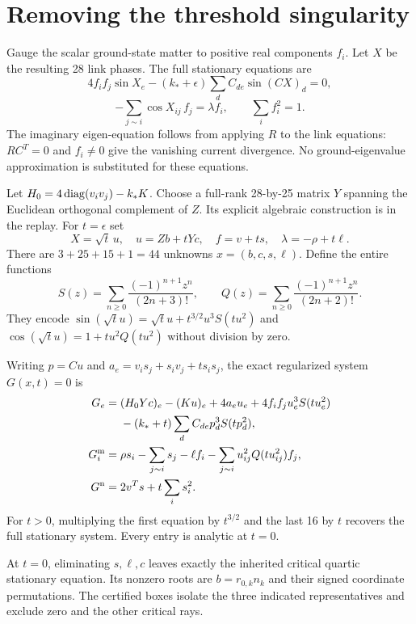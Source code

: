 \documentclass[11pt,a4paper]{article}
\begin{document}
\section{Removing the threshold singularity}
Gauge the scalar ground-state matter to positive real components $f_i$. Let $X$ be the resulting 28 link phases. The full stationary equations are
\[
4f_if_j\sin X_e-(k_*+\epsilon)\sum_d C_{de}\sin(CX)_d=0,
\]
\[
-\sum_{j\sim i}\cos X_{ij}\,f_j=\lambda f_i,\qquad \sum_i f_i^2=1.
\]
The imaginary eigen-equation follows from applying $R$ to the link equations: $RC^T=0$ and $f_i\ne0$ give the vanishing current divergence. No ground-eigenvalue approximation is substituted for these equations.

Let $H_0=4\operatorname{diag}(v_iv_j)-k_*K$. Choose a full-rank 28-by-25 matrix $Y$ spanning the Euclidean orthogonal complement of $Z$. Its explicit algebraic construction is in the replay. For $t=\epsilon$ set
\[
X=\sqrt t\,u,\quad u=Zb+tYc,\quad f=v+ts,\quad\lambda=-\rho+t\ell.
\]
There are $3+25+15+1=44$ unknowns $x=(b,c,s,\ell)$. Define the entire functions
\[
S(z)=\sum_{n\ge0}\frac{(-1)^{n+1}z^n}{(2n+3)!},\qquad
Q(z)=\sum_{n\ge0}\frac{(-1)^{n+1}z^n}{(2n+2)!}.
\]
They encode $\sin(\sqrt t u)=\sqrt t u+t^{3/2}u^3S(tu^2)$ and
$\cos(\sqrt t u)=1+tu^2Q(tu^2)$ without division by zero.

Writing $p=Cu$ and $a_e=v_is_j+s_iv_j+ts_is_j$, the exact regularized system $G(x,t)=0$ is
\begin{align*}
G_e={}&(H_0Yc)_e-(Ku)_e+4a_eu_e+4f_if_ju_e^3S(tu_e^2)\\
&-(k_*+t)\sum_d C_{de}p_d^3S(tp_d^2),\\
G_i^{\rm m}={}&\rho s_i-\sum_{j\sim i}s_j-\ell f_i
-\sum_{j\sim i}u_{ij}^2Q(tu_{ij}^2)f_j,\\
G^{\rm n}={}&2v^Ts+t\sum_i s_i^2.
\end{align*}
For $t>0$, multiplying the first equation by $t^{3/2}$ and the last 16 by $t$ recovers the full stationary system. Every entry is analytic at $t=0$.

At $t=0$, eliminating $s,\ell,c$ leaves exactly the inherited critical quartic stationary equation. Its nonzero roots are $b=r_{0,k}n_k$ and their signed coordinate permutations. The certified boxes isolate the three indicated representatives and exclude zero and the other critical rays.
\newpage
\end{document}
